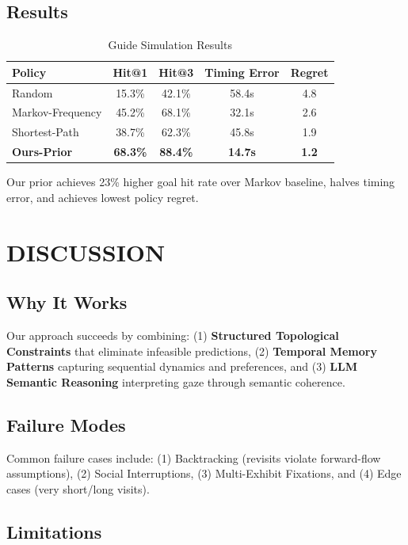 \documentclass{article}
\begin{document}
\subsection{Results}

\begin{table}[h]
\centering
\caption{Guide Simulation Results}
\begin{tabular}{lcccc}
\toprule
Policy & Hit@1 & Hit@3 & Timing Error & Regret \\
\midrule
Random & 15.3\% & 42.1\% & 58.4s & 4.8 \\
Markov-Frequency & 45.2\% & 68.1\% & 32.1s & 2.6 \\
Shortest-Path & 38.7\% & 62.3\% & 45.8s & 1.9 \\
\textbf{Ours-Prior} & \textbf{68.3\%} & \textbf{88.4\%} & \textbf{14.7s} & \textbf{1.2} \\
\bottomrule
\end{tabular}
\end{table}

Our prior achieves 23\% higher goal hit rate over Markov baseline, halves timing error, and achieves lowest policy regret.

\section{DISCUSSION}

\subsection{Why It Works}

Our approach succeeds by combining: (1) \textbf{Structured Topological Constraints} that eliminate infeasible predictions, (2) \textbf{Temporal Memory Patterns} capturing sequential dynamics and preferences, and (3) \textbf{LLM Semantic Reasoning} interpreting gaze through semantic coherence.

\subsection{Failure Modes}

Common failure cases include: (1) Backtracking (revisits violate forward-flow assumptions), (2) Social Interruptions, (3) Multi-Exhibit Fixations, and (4) Edge cases (very short/long visits).

\subsection{Limitations}
\end{document}
